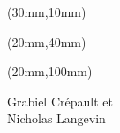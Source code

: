 \begin{textblock*}{500mm}(30mm,10mm)
{ \color{white} 
\TITLE
}
\end{textblock*}

\null\newpage

\begin{textblock*}{\paperwidth}(20mm,40mm)
\raggedright
\TITLE
\end{textblock*}

\begin{textblock*}{\paperwidth}(20mm,100mm)
\raggedright
Grabiel Crépault et \\
Nicholas Langevin
\end{textblock*}

\null\newpage
